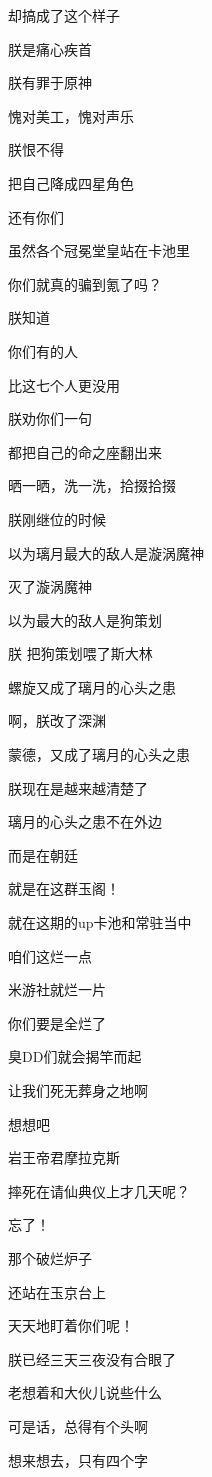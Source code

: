 \documentclass[UTF8, 12pt, A4paper]{article}
\begin{document}
却搞成了这个样子

朕是痛心疾首

朕有罪于原神

愧对美工，愧对声乐

朕恨不得

把自己降成四星角色

还有你们

虽然各个冠冕堂皇站在卡池里

你们就真的骗到氪了吗？

朕知道

你们有的人

比这七个人更没用

朕劝你们一句

都把自己的命之座翻出来

晒一晒，洗一洗，拾掇拾掇

朕刚继位的时候

以为璃月最大的敌人是漩涡魔神

灭了漩涡魔神

以为最大的敌人是狗策划

朕 \quad 把狗策划喂了斯大林

螺旋又成了璃月的心头之患

啊，朕改了深渊

蒙德，又成了璃月的心头之患

朕现在是越来越清楚了

璃月的心头之患不在外边

而是在朝廷

就是在这群玉阁！

就在这期的up卡池和常驻当中

咱们这烂一点

米游社就烂一片

你们要是全烂了

臭DD们就会揭竿而起

让我们死无葬身之地啊

想想吧

岩王帝君摩拉克斯

摔死在请仙典仪上才几天呢？

忘了！

那个破烂炉子

还站在玉京台上

天天地盯着你们呢！

朕已经三天三夜没有合眼了

老想着和大伙儿说些什么

可是话，总得有个头啊

想来想去，只有四个字
\end{document}
